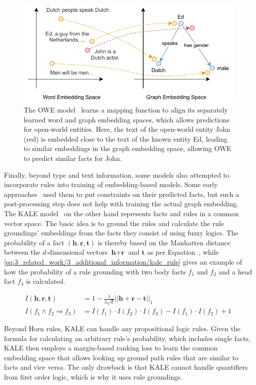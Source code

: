 \begin{figure}[t]
    \centering
    \includegraphics{3_related_work/3_additional_information/owe}
    \caption{The OWE model~\cite{Shah2019AnOE} learns a mapping function to align its separately learned word and graph embedding spaces, which allows predictions for open-world entities. Here, the text of the open-world entity John (red) is embedded close to the text of the known entity Ed, leading to similar embeddings in the graph embedding space, allowing OWE to predict similar facts for John.}
    \label{fig:3_related_work/3_additional_information/owe}
\end{figure}

Finally, beyond type and text information, some models also attempted to incorporate rules into training of embedding-based models. Some early approaches~\cite{Wang2015KnowledgeBC, Wei2015LargescaleKB} used them to put constraints on their predicted facts, but such a post-processing step does not help with training the actual graph embedding. The KALE model~\cite{Guo2016JointlyEK} on the other hand represents facts and rules in a common vector space. The basic idea is to ground the rules and calculate the rule groundings' embeddings from the facts they consist of using fuzzy logics. The probability of a fact $(\textbf{h}, \textbf{r}, \textbf{t})$ is thereby based on the Manhatten distance between the $d$-dimensional vectors $\textbf{h} + \textbf{r}$ and $\textbf{t}$ as per Equation~\cite{eq:3_related_work/3_additional_information/kale_fact}, while \autoref{eq:3_related_work/3_additional_information/kale_rule} gives an example of how the probability of a rule grounding with two body facts $f_1$ and $f_2$ and a head fact $f_3$ is calculated.

\begin{align}
    I(\textbf{h}, \textbf{r}, \textbf{t}) &= 1 - \frac{1}{3 \sqrt {d}} {|| \textbf{h} + \textbf{r} - \textbf{t} ||}_1
    \label{eq:3_related_work/3_additional_information/kale_fact} \\
    I(f_1 \land f_2 \Rightarrow f_3) &= I(f_1) \cdot I(f_2) \cdot I(f_3) - I(f_1) \cdot I(f_2) + 1
    \label{eq:3_related_work/3_additional_information/kale_rule}
\end{align}

Beyond Horn rules, KALE can handle any propositional logic rules. Given the formula for calculating an arbitrary rule's probability, which includes single facts, KALE then employs a margin-based ranking loss to learn the common embedding space that allows looking up ground path rules that are similar to facts and vice versa. The only drawback is that KALE cannot handle quantifiers from first order logic, which is why it uses rule groundings.
